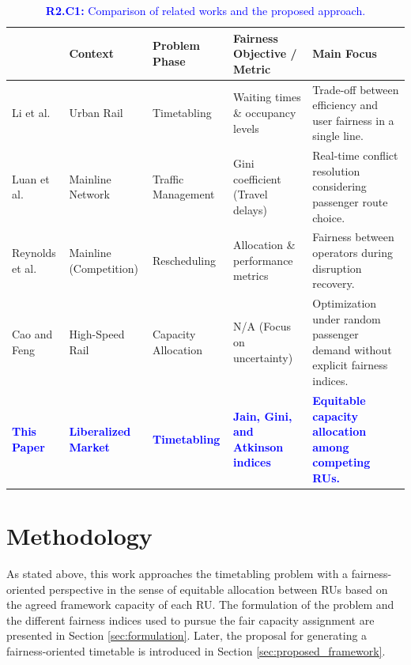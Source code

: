 \documentclass[preprint,12pt]{elsarticle}
\begin{document}
\begin{table}[htbp]
\centering
\begin{adjustbox}{max width=\textwidth}
\begin{tabular}{|l|C{60pt}|C{70pt}|C{100pt}|C{140pt}|}
\hline
{} & \textbf{Context} & \textbf{Problem Phase} & \textbf{Fairness Objective / Metric} & \textbf{Main Focus} \\
\hline \hline
Li et al. \cite{Zhang2019} & Urban Rail & Timetabling & Waiting times \& occupancy levels & Trade-off between efficiency and user fairness in a single line. \\ \hline
Luan et al. \cite{Luan2023} & Mainline Network & Traffic Management & Gini coefficient (Travel delays) & Real-time conflict resolution considering passenger route choice. \\ \hline
Reynolds et al. \cite{Reynolds2023} & Mainline (Competition) & Rescheduling & Allocation \& performance metrics & Fairness between operators during disruption recovery. \\ \hline
Cao and Feng \cite{Cao2020} & High-Speed Rail & Capacity Allocation & N/A (Focus on uncertainty) & Optimization under random passenger demand without explicit fairness indices. \\ \hline
\textcolor{blue}{\textbf{This Paper}} & \textcolor{blue}{\textbf{Liberalized Market}} & \textcolor{blue}{\textbf{Timetabling}} & \textcolor{blue}{\textbf{Jain, Gini, and Atkinson indices}} & \textcolor{blue}{\textbf{Equitable capacity allocation among competing RUs.}} \\ \hline
\end{tabular}
\end{adjustbox}
\caption{\textcolor{blue}{\textbf{R2.C1:} Comparison of related works and the proposed approach.}}
\label{tab:contrib_comparison}
\end{table}

\section{Methodology}\label{sec:Methodology}

As stated above, this work approaches the timetabling problem with a fairness-oriented perspective in the sense of equitable allocation between \glspl{RU} based on the agreed framework capacity of each RU. The formulation of the problem  and the different fairness indices used to pursue the fair capacity assignment are presented in Section \ref{sec:formulation}. Later, the proposal for generating a fairness-oriented timetable is introduced in Section \ref{sec:proposed_framework}.
\end{document}
